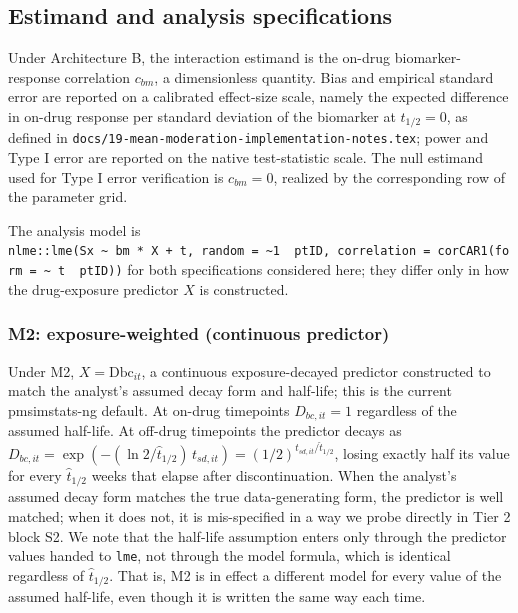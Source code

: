 \documentclass[
  11pt,
]{article}
\begin{document}
\subsection{Estimand and analysis specifications}\label{estimand-and-analysis-specifications}

Under Architecture B, the interaction estimand is the on-drug
biomarker-response correlation \(c_{bm}\), a dimensionless quantity.
Bias and empirical standard error are reported on a calibrated
effect-size scale, namely the expected difference in on-drug
response per standard deviation of the biomarker at \(t_{1/2} = 0\),
as defined in \texttt{docs/19-mean-moderation-implementation-notes.tex};
power and Type I error are reported on the native test-statistic
scale. The null estimand used for Type I error verification is
\(c_{bm} = 0\), realized by the corresponding row of the parameter
grid.

The analysis model is \texttt{nlme::lme(Sx\ \textasciitilde{}\ bm\ *\ X\ +\ t,\ random\ =\ \textasciitilde{}1\ \textbar{}\ ptID,\ correlation\ =\ corCAR1(form\ =\ \textasciitilde{}\ t\ \textbar{}\ ptID))} for both
specifications considered here; they differ only in how the
drug-exposure predictor \(X\) is constructed.

\subsubsection{M2: exposure-weighted (continuous predictor)}\label{m2-exposure-weighted-continuous-predictor}

Under M2, \(X = \text{Dbc}_{it}\), a continuous exposure-decayed
predictor constructed to match the analyst's assumed decay form and
half-life; this is the current pmsimstats-ng default. At on-drug
timepoints \(D_{bc,it} = 1\) regardless of the assumed half-life. At
off-drug timepoints the predictor decays as
\(D_{bc,it} = \exp(-(\ln 2/\hat{t}_{1/2})\,t_{sd,it}) =
(1/2)^{t_{sd,it}/\hat{t}_{1/2}}\), losing exactly half its value for
every \(\hat{t}_{1/2}\) weeks that elapse after discontinuation. When
the analyst's assumed decay form matches the true data-generating
form, the predictor is well matched; when it does not, it is
mis-specified in a way we probe directly in Tier 2 block S2. We note
that the half-life assumption enters only through the predictor
values handed to \texttt{lme}, not through the model formula, which is
identical regardless of \(\hat{t}_{1/2}\). That is, M2 is in effect a
different model for every value of the assumed half-life, even
though it is written the same way each time.
\end{document}
